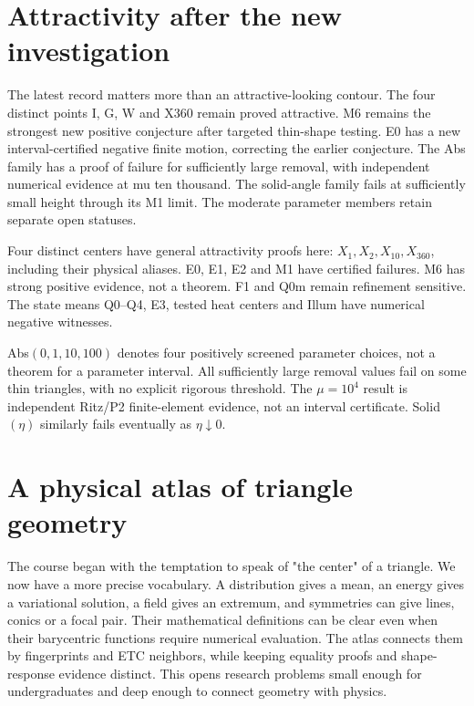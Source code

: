 \documentclass[11pt,oneside,openany]{book}
\begin{document}
\section{Attractivity after the new investigation}\label{sec:slide89}

The latest record matters more than an attractive-looking contour. The four distinct points I, G, W and X360 remain proved attractive. M6 remains the strongest new positive conjecture after targeted thin-shape testing. E0 has a new interval-certified negative finite motion, correcting the earlier conjecture. The Abs family has a proof of failure for sufficiently large removal, with independent numerical evidence at mu ten thousand. The solid-angle family fails at sufficiently small height through its M1 limit. The moderate parameter members retain separate open statuses.



Four distinct centers have general attractivity proofs here:
$X_1,X_2,X_{10},X_{360}$, including their physical aliases.
E0, E1, E2 and M1 have certified failures.
M6 has strong positive evidence, not a theorem.
F1 and Q0m remain refinement sensitive.
The state means Q0--Q4, E3, tested heat centers and Illum have
numerical negative witnesses.

Abs$(0,1,10,100)$ denotes four positively screened parameter choices,
not a theorem for a parameter interval. All sufficiently large
removal values fail on some thin triangles, with no explicit
rigorous threshold. The $\mu=10^4$ result is independent Ritz/P2
finite-element evidence, not an interval certificate.
Solid$(\eta)$ similarly fails eventually as $\eta\downarrow0$.




\section{A physical atlas of triangle geometry}\label{sec:slide90}

The course began with the temptation to speak of "the center" of a triangle. We now have a more precise vocabulary. A distribution gives a mean, an energy gives a variational solution, a field gives an extremum, and symmetries can give lines, conics or a focal pair. Their mathematical definitions can be clear even when their barycentric functions require numerical evaluation. The atlas connects them by fingerprints and ETC neighbors, while keeping equality proofs and shape-response evidence distinct. This opens research problems small enough for undergraduates and deep enough to connect geometry with physics.
\end{document}
